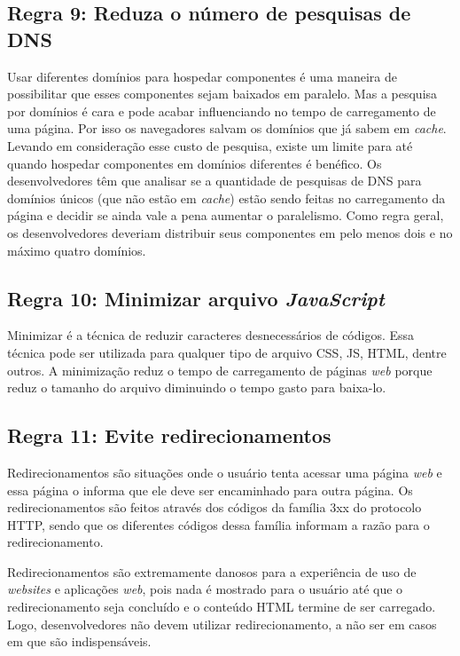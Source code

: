 \subsection{Regra 9: Reduza o número de pesquisas de DNS}
\label{subsec:highperformance_regra9}
Usar diferentes domínios para hospedar componentes é uma maneira de possibilitar que esses componentes sejam baixados em paralelo. Mas a pesquisa por domínios é cara e pode acabar influenciando no tempo de carregamento de uma página. Por isso os navegadores salvam os domínios que já sabem em \textit{cache}. Levando em consideração esse custo de pesquisa, existe um limite para até quando hospedar componentes em domínios diferentes é benéfico. Os desenvolvedores têm que analisar se a quantidade de pesquisas de DNS para domínios únicos (que não estão em \textit{cache}) estão sendo feitas no carregamento da página e decidir se ainda vale a pena aumentar o paralelismo. Como regra geral, os desenvolvedores deveriam distribuir seus componentes em pelo menos dois e no máximo quatro domínios.

\subsection{Regra 10: Minimizar arquivo \textit{JavaScript}}
\label{subsec:highperformance_regra10}
Minimizar é a técnica de reduzir caracteres desnecessários de códigos. Essa técnica pode ser utilizada para qualquer tipo de arquivo CSS, JS, HTML, dentre outros. A minimização reduz o tempo de carregamento de páginas \textit{web} porque reduz o tamanho do arquivo diminuindo o tempo gasto para baixa-lo.

\subsection{Regra 11: Evite redirecionamentos}
\label{subsec:highperformance_regra11}
Redirecionamentos são situações onde o usuário tenta acessar uma página \textit{web} e essa página o informa que ele deve ser encaminhado para outra página. Os redirecionamentos são feitos através dos códigos da família 3xx do protocolo HTTP, sendo que os diferentes códigos dessa família informam a razão para o redirecionamento.

Redirecionamentos são extremamente danosos para a experiência de uso de \textit{websites} e aplicações \textit{web}, pois nada é mostrado para o usuário até que o redirecionamento seja concluído e o conteúdo HTML termine de ser carregado. Logo, desenvolvedores não devem utilizar redirecionamento, a não ser em casos em que são indispensáveis.

